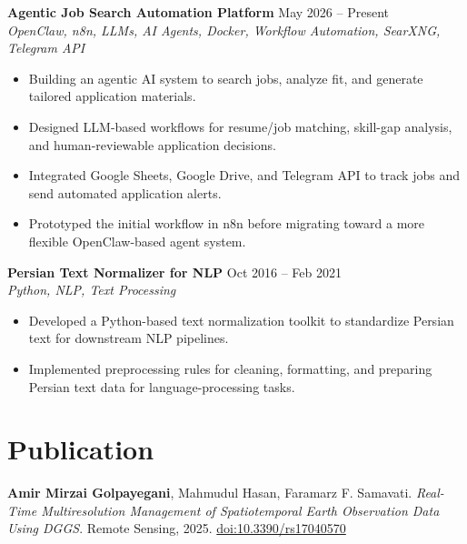 \documentclass[a4paper,10pt]{article}
\newcommand{\resumeSubheading}[4]{
    \textbf{#1} \hfill #2 \\
    \textit{#3} \hfill \textit{#4}
}
\begin{document}
\noindent
\textbf{Agentic Job Search Automation Platform} \hfill May 2026 -- Present \\
\textit{OpenClaw, n8n, LLMs, AI Agents, Docker, Workflow Automation, SearXNG, Telegram API}
\begin{itemize}[leftmargin=0.25in]
    \item Building an agentic AI system to search jobs, analyze fit, and generate tailored application materials.
    \item Designed LLM-based workflows for resume/job matching, skill-gap analysis, and human-reviewable application decisions.
    \item Integrated Google Sheets, Google Drive, and Telegram API to track jobs and send automated application alerts.
    \item Prototyped the initial workflow in n8n before migrating toward a more flexible OpenClaw-based agent system.
\end{itemize}

\noindent
\textbf{Persian Text Normalizer for NLP} \hfill Oct 2016 -- Feb 2021 \\
\textit{Python, NLP, Text Processing}
\begin{itemize}[leftmargin=0.25in]
    \item Developed a Python-based text normalization toolkit to standardize Persian text for downstream NLP pipelines.
    \item Implemented preprocessing rules for cleaning, formatting, and preparing Persian text data for language-processing tasks.
\end{itemize}

\section*{Publication}

\textbf{Amir Mirzai Golpayegani}, Mahmudul Hasan, Faramarz F. Samavati. 
\textit{Real-Time Multiresolution Management of Spatiotemporal Earth Observation Data Using DGGS}. 
Remote Sensing, 2025. \href{https://doi.org/10.3390/rs17040570}{doi:10.3390/rs17040570}



\end{document}
